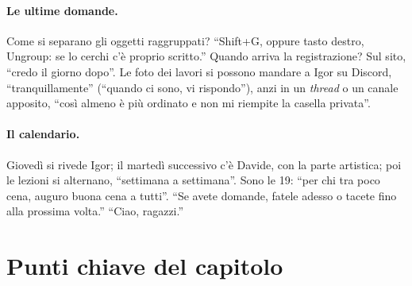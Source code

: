 \paragraph{Le ultime domande.} Come si separano gli oggetti raggruppati? ``Shift+G, oppure
tasto destro, Ungroup: se lo cerchi c'è proprio scritto.'' Quando arriva la
registrazione? Sul sito, ``credo il giorno dopo''. Le foto dei lavori si possono mandare
a Igor su Discord, ``tranquillamente'' (``quando ci sono, vi rispondo''), anzi in un
\emph{thread} o un canale apposito, ``così almeno è più ordinato e non mi riempite la
casella privata''.

\paragraph{Il calendario.} Giovedì si rivede Igor; il martedì successivo c'è Davide, con
la parte artistica; poi le lezioni si alternano, ``settimana a settimana''. Sono le 19:
``per chi tra poco cena, auguro buona cena a tutti''. ``Se avete domande, fatele adesso o
tacete fino alla prossima volta.'' ``Ciao, ragazzi.''

\section*{Punti chiave del capitolo}

